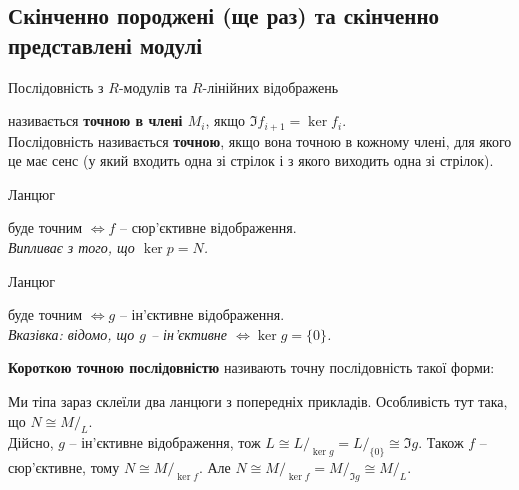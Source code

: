 \documentclass{math_library}
\begin{document}
\subsection{Скінченно породжені (ще раз) та скінченно представлені модулі}
\begin{definition}
Послідовність з $R$-модулів та $R$-лінійних відображень
\begin{figure}[H]
\centering
{}
\end{figure}
називається \textbf{точною в члені $M_i$}, якщо $\Im f_{i+1} = \ker f_i$.\\
Послідовність називається \textbf{точною}, якщо вона  точною в кожному члені, для якого це має сенс (у який входить одна зі стрілок і з якого виходить одна зі стрілок).
\end{definition}

\begin{example}
\label{chain_for_surjective_map}
Ланцюг  буде точним $\iff f$ -- сюр'єктивне відображення.\\
\textit{Випливає з того, що $\ker p = N$.}
\end{example}

\begin{example}
\label{chain_for_injective_map}
Ланцюг  буде точним $\iff g$ -- ін'єктивне відображення.\\
\textit{Вказівка: відомо, що $g$ -- ін'єктивне $\iff \ker g = \{0\}$.}
\end{example}

\begin{example}
\textbf{Короткою точною послідовністю} називають точну послідовність такої форми:
\begin{figure}[H]
\centering
{}
\end{figure}
Ми тіпа зараз склеїли два ланцюги з попередніх прикладів. Особливість тут така, що $N \cong M/_L$.\\
Дійсно, $g$ -- ін'єктивне відображення, тож $L \cong L/_{\ker g} = L/_{\{0\}} \cong \Im g$. Також $f$ -- сюр'єктивне, тому $N \cong M/_{\ker f}$. Але $N \cong M/_{\ker f} = M/_{\Im g} \cong M/_L$.
\end{example}
\end{document}
